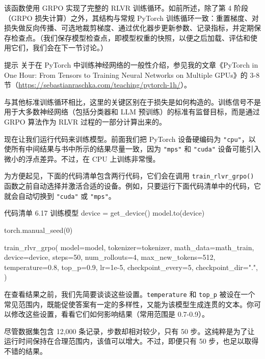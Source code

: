 该函数使用 GRPO 实现了完整的 RLVR 训练循环。如前所述，除了第 4 阶段（GRPO 损失计算）之外，其结构与常规 PyTorch 训练循环一致：重置梯度、对损失做反向传播、可选地裁剪梯度、通过优化器步更新参数、记录指标，并定期保存检查点。（我们保存模型检查点，即模型权重的快照，以便之后加载、评估和使用它们，我们会在下一节讨论。）

\begin{myWarning}{提示}
 关于在 PyTorch 中训练神经网络的一般性介绍，参见我的文章《PyTorch in One Hour: From Tensors to Training Neural Networks on Multiple GPUs》的 3-8 节（\href{https://sebastianraschka.com/teaching/pytorch-1h/}{https://sebastianraschka.com/teaching/pytorch-1h/}）。\end{myWarning}

与其他标准训练循环相比，这里的关键区别在于损失是如何构造的。训练信号不是用于大多数神经网络（包括分类器和 LLM 预训练）的标准有监督目标，而是通过 GRPO 算法作为 RLVR 过程的一部分计算出来的。

现在让我们运行代码来训练模型。前面我们把 PyTorch 设备硬编码为 \texttt{"}\texttt{cpu}\texttt{"}，以使所有中间结果与书中所示的结果尽量一致，因为 \texttt{"}\texttt{mps}\texttt{"} 和 \texttt{"}\texttt{cuda}\texttt{"} 设备可能引入微小的浮点差异。不过，在 CPU 上训练非常慢。

为方便起见，下面的代码清单包含两行代码，它们会在调用 \texttt{train\_rlvr\_grpo()} 函数之前自动选择并激活合适的设备。例如，只要运行下面代码清单中的代码，它就会自动切换到 \texttt{"}\texttt{cuda}\texttt{"} 或 \texttt{"}\texttt{mps}\texttt{"}。

\begin{codeboxt}{代码清单 6.17 训练模型}
device = get_device()
model.to(device)

torch.manual_seed(0)

train_rlvr_grpo(
    model=model,
    tokenizer=tokenizer,
    math_data=math_train,
    device=device,
    steps=50,
    num_rollouts=4,
    max_new_tokens=512,
    temperature=0.8,
    top_p=0.9,
    lr=1e-5,
    checkpoint_every=5,
    checkpoint_dir=".",
)
\end{codeboxt}

在查看结果之前，我们先简要谈谈这些设置。\texttt{temperature} 和 \texttt{top\_p} 被设在一个常见范围内，既能促使答案有一定的多样性，又能为该模型生成连贯的文本。你可以修改这些设置，看看它们如何影响结果（常用范围是 0.7-0.9）。

尽管数据集包含 12,000 条记录，步数却相对较少，只有 50 步。这纯粹是为了让运行时间保持在合理范围内，该值可以增大。不过，即便只有 50 步，也足以取得不错的结果。


